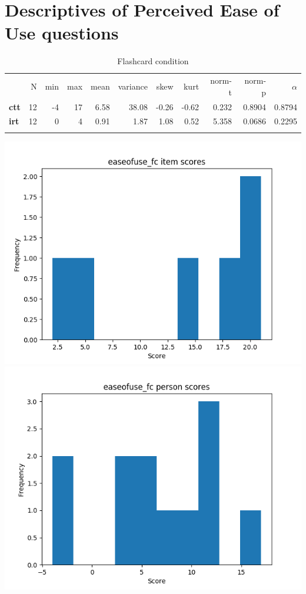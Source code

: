 \section{Descriptives of Perceived Ease of Use questions}\label{ease-of-use}

\begin{longtable}[c]{@{}lrrrrrrrrrr@{}}
\caption{Flashcard condition}
\endfirsthead
\toprule\addlinespace
& N & min & max & mean & variance & skew & kurt & norm-t &
norm-p & $\alpha$
\\\addlinespace
\midrule
\textbf{ctt} & 12 & -4 & 17 & 6.58 & 38.08 & -0.26 & -0.62 & 0.232 &
0.8904 & 0.8794
\\\addlinespace
\textbf{irt} & 12 & 0 & 4 & 0.91 & 1.87 & 1.08 & 0.52 & 5.358 & 0.0686 &
0.2295
\\\addlinespace
\bottomrule
\end{longtable}

\includegraphics[width=\textwidth]{img/easeofuse_fc_diff.png}
\includegraphics[width=\textwidth]{img/easeofuse_fc_abil.png}

